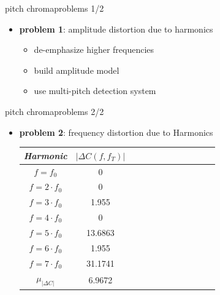         \begin{frame}{pitch chroma}{problems 1/2}
            
            \begin{itemize}
                \item	\textbf{problem 1}: amplitude distortion due to harmonics
                        \begin{itemize}
                            \item<2->	[$\Rightarrow$]	de-emphasize higher frequencies
                            \item<3->	[$\Rightarrow$]	build amplitude model
                            \item<4->	[$\Rightarrow$]	use multi-pitch detection system
                        \end{itemize}
            \end{itemize}
        \end{frame}
        \begin{frame}{pitch chroma}{problems 2/2}
            \begin{itemize}
                \item	\textbf{problem 2}: frequency distortion due to Harmonics
                \begin{table}
                    \centering
                    \begin{tabular}{cccccccccccc} %
                        \\ \hline
                        \bf{\emph{Harmonic}}	 & \bf{\emph{$|\Delta C(f,f_T)|$}}\\ 
                         \hline
                        \bf{$f = f_0$}	 & 0\\
                        \bf{$f = 2\cdot f_0$}	 & 0\\
                        \bf{$f = 3\cdot f_0$}	 & 1.955\\
                        \bf{$f = 4\cdot f_0$}	 & 0\\
                        \bf{$f = 5\cdot f_0$}	 & 13.6863\\
                        \bf{$f = 6\cdot f_0$}	 & 1.955\\
                        \bf{$f = 7\cdot f_0$}	 & 31.1741\\
                        \hline
                        \bf{$\mu_{|\Delta C|}$}	 & 6.9672\\
                    \end{tabular}
                \end{table}
            \end{itemize}
        \end{frame}

